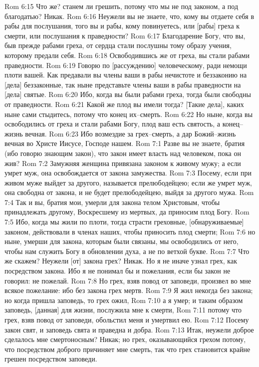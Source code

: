 Rom 6:15  Что же? станем ли грешить, потому что мы не под законом, а под благодатью? Никак.
Rom 6:16  Неужели вы не знаете, что, кому вы отдаете себя в рабы для послушания, того вы и рабы, кому повинуетесь, или [рабы] греха к смерти, или послушания к праведности?
Rom 6:17  Благодарение Богу, что вы, быв прежде рабами греха, от сердца стали послушны тому образу учения, которому предали себя.
Rom 6:18  Освободившись же от греха, вы стали рабами праведности.
Rom 6:19  Говорю по [рассуждению] человеческому, ради немощи плоти вашей. Как предавали вы члены ваши в рабы нечистоте и беззаконию на [дела] беззаконные, так ныне представьте члены ваши в рабы праведности на [дела] святые.
Rom 6:20  Ибо, когда вы были рабами греха, тогда были свободны от праведности.
Rom 6:21  Какой же плод вы имели тогда? [Такие дела], каких ныне сами стыдитесь, потому что конец их--смерть.
Rom 6:22  Но ныне, когда вы освободились от греха и стали рабами Богу, плод ваш есть святость, а конец--жизнь вечная.
Rom 6:23  Ибо возмездие за грех--смерть, а дар Божий--жизнь вечная во Христе Иисусе, Господе нашем.
Rom 7:1  Разве вы не знаете, братия (ибо говорю знающим закон), что закон имеет власть над человеком, пока он жив?
Rom 7:2  Замужняя женщина привязана законом к живому мужу; а если умрет муж, она освобождается от закона замужества.
Rom 7:3  Посему, если при живом муже выйдет за другого, называется прелюбодейцею; если же умрет муж, она свободна от закона, и не будет прелюбодейцею, выйдя за другого мужа.
Rom 7:4  Так и вы, братия мои, умерли для закона телом Христовым, чтобы принадлежать другому, Воскресшему из мертвых, да приносим плод Богу.
Rom 7:5  Ибо, когда мы жили по плоти, тогда страсти греховные, [обнаруживаемые] законом, действовали в членах наших, чтобы приносить плод смерти;
Rom 7:6  но ныне, умерши для закона, которым были связаны, мы освободились от него, чтобы нам служить Богу в обновлении духа, а не по ветхой букве.
Rom 7:7  Что же скажем? Неужели [от] закона грех? Никак. Но я не иначе узнал грех, как посредством закона. Ибо я не понимал бы и пожелания, если бы закон не говорил: не пожелай.
Rom 7:8  Но грех, взяв повод от заповеди, произвел во мне всякое пожелание: ибо без закона грех мертв.
Rom 7:9  Я жил некогда без закона; но когда пришла заповедь, то грех ожил,
Rom 7:10  а я умер; и таким образом заповедь, [данная] для жизни, послужила мне к смерти,
Rom 7:11  потому что грех, взяв повод от заповеди, обольстил меня и умертвил ею.
Rom 7:12  Посему закон свят, и заповедь свята и праведна и добра.
Rom 7:13  Итак, неужели доброе сделалось мне смертоносным? Никак; но грех, оказывающийся грехом потому, что посредством доброго причиняет мне смерть, так что грех становится крайне грешен посредством заповеди.

